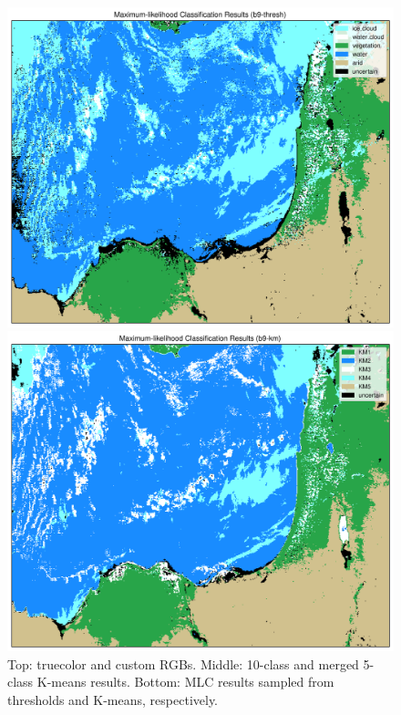 \documentclass[12pt]{article}
\begin{document}
\begin{figure}[h!]
\begin{center}
{            \includegraphics[width=.4\paperwidth]{figs/class/mlc_b9-thresh_6c.png}

            \includegraphics[width=.4\paperwidth]{figs/class/mlc_b9-km_6c.png}
        }
    \end{center}

    \caption{Top: truecolor and custom RGBs. Middle: 10-class and merged 5-class K-means results. Bottom: MLC results sampled from thresholds and K-means, respectively.}
    \label{all_results}
\end{figure}

\clearpage


\end{document}
